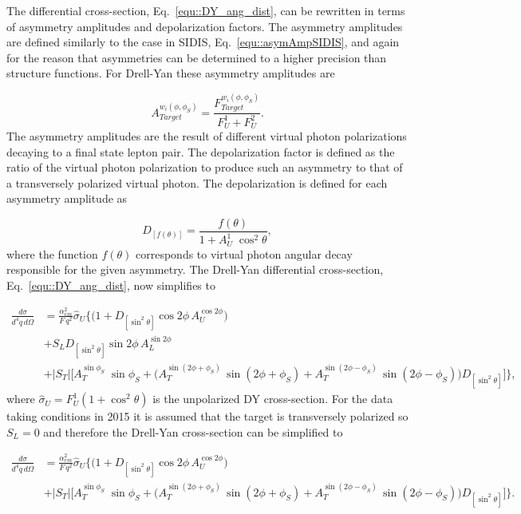 The differential cross-section, Eq.~\ref{equ::DY_ang_dist}, can be rewritten in
terms of asymmetry amplitudes and depolarization factors.  The asymmetry
amplitudes are defined similarly to the case in SIDIS,
Eq.~\ref{equ::asymAmpSIDIS}, and again for the reason that asymmetries can be
determined to a higher precision than structure functions.  For Drell-Yan these
asymmetry amplitudes are

\begin{equation}
  A^{w_i(\phi, \phi_S)}_{Target} = \frac{F^{w_i(\phi,
      \phi_S)}_{Target}}{F_{U}^1+F_{U}^2}.
  \label{equ::asymAmpDY}
\end{equation}
\noindent
The asymmetry amplitudes are the result of different virtual photon
polarizations decaying to a final state lepton pair.  The depolarization factor
is defined as the ratio of the virtual photon polarization to produce such an
asymmetry to that of a transversely polarized virtual photon.  The
depolarization is defined for each asymmetry amplitude as

\begin{equation}
  D_{[f(\theta)]} = \frac{f(\theta)}{1+A_U^1\;\cos^2\theta},
  \label{equ::DYDepolarizationFactorDef}
\end{equation}
\noindent
where the function $f(\theta)$ corresponds to virtual photon angular decay
responsible for the given asymmetry.  The Drell-Yan differential cross-section,
Eq.~\ref{equ::DY_ang_dist}, now simplifies to~\cite{AKotzininaNote}

\begin{align}
  \label{equ::DY_usefulXsect}
  \frac{d\sigma}{d^4 q \, d \Omega} &=
  \frac{\alpha_{em}^2}{F \, q^2}\hat{\sigma}_U
  \Big \{ \Big(1 + D_{[\sin^2 \theta]} \cos 2\phi \, A_{U}^{\cos 2\phi} \Big)
 \nonumber \\
 &+ S_{L} D_{[\sin^2 \theta]} \sin 2\phi \, A_{L}^{\sin 2\phi}
   \nonumber \\
   &+ |S_{T}|
   \Big[A_{T}^{\sin \phi_S}\;\sin \phi_{S} 
     + \Big( A_{T}^{\sin (2\phi +\phi_S)}\, \sin(2\phi+\phi_S) +
     A_{T}^{\sin (2\phi - \phi_S)}\, \sin(2\phi-\phi_S) \Big)D_{[\sin ^2\theta]}
     \Big ]
   \Big \},
\end{align}
\noindent
where $\hat{\sigma}_U = F^1_U (1+\cos^2\theta)$ is the unpolarized DY
cross-section.  For the data taking conditions in 2015 it is assumed that the target is transversely polarized so $S_L = 0$ and therefore the Drell-Yan cross-section can be simplified to

\begin{align}
  \label{equ::DY_MostusefulXsect}
  \frac{d\sigma}{d^4 q \, d \Omega} &=
  \frac{\alpha_{em}^2}{F \, q^2}\hat{\sigma}_U
  \Big \{ \Big(1 + D_{[\sin^2 \theta]} \cos 2\phi \, A_{U}^{\cos 2\phi} \Big)
   \nonumber \\
   &+ |S_{T}|
   \Big[A_{T}^{\sin \phi_S}\;\sin \phi_{S} 
     + \Big( A_{T}^{\sin (2\phi +\phi_S)}\, \sin(2\phi+\phi_S) +
     A_{T}^{\sin (2\phi - \phi_S)}\, \sin(2\phi-\phi_S) \Big)D_{[\sin ^2\theta]}
     \Big ]
   \Big \}.
\end{align}

